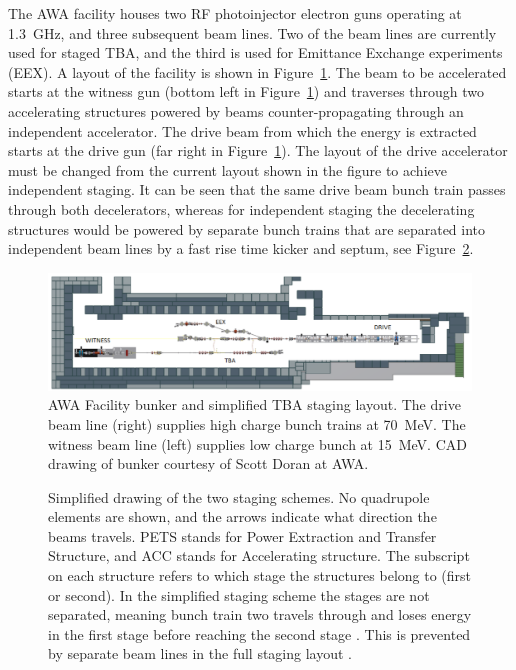The AWA facility houses two RF photoinjector electron guns operating
at \SI{1.3}{GHz}, and three subsequent beam lines. 
Two of the beam lines are currently used for staged TBA, and the
third is used for Emittance Exchange experiments (EEX). A layout of
the facility is shown in Figure~\ref{fig:bunker}.  
The beam to be accelerated starts at the witness gun (bottom left in Figure~\ref{fig:bunker}) 
and traverses through two accelerating structures powered by beams counter-propagating through 
an independent accelerator. The drive beam from which the energy is extracted starts at the drive gun (far right in Figure~\ref{fig:bunker}).
The layout of the drive accelerator must be changed from the current layout shown in the figure to achieve independent staging.  
It can be seen that the same drive beam bunch train passes through both decelerators, 
whereas for independent staging the decelerating structures would be powered by separate bunch trains
that are separated into independent beam lines by a fast rise time kicker and septum, see Figure~\ref{fig:singlestage}. 
\begin{figure}
	\begin{center}
		\includegraphics[width=\linewidth]{./images/bunker}
	\end{center}
	\caption{AWA Facility bunker and simplified TBA staging layout. 
		The drive beam line (right) supplies high charge bunch trains at \SI{70}{MeV}.
		The witness beam line (left) supplies  low charge  bunch at \SI{15}{MeV}. 
		CAD drawing of bunker courtesy of Scott Doran at AWA.}
	\label{fig:bunker}
\end{figure}
\begin{figure}
	\begin{center}
		\begin{tikzpicture}[scale=\textwidth/35cm, text=black]
		
		\end{tikzpicture}
	\end{center}
	\caption{Simplified drawing of the two staging schemes.
		No quadrupole elements are shown, and the arrows indicate what direction the beams travels.
		PETS stands for Power Extraction and Transfer Structure, and ACC stands for Accelerating structure. 
		The subscript on each structure refers to which stage the structures belong to (first or second). 
		In the simplified staging scheme the stages are not separated, meaning bunch train two travels
		through and loses energy in the first stage before reaching the second stage .
		This is prevented by separate beam lines in the full staging layout . }
	\label{fig:singlestage}
\end{figure}

